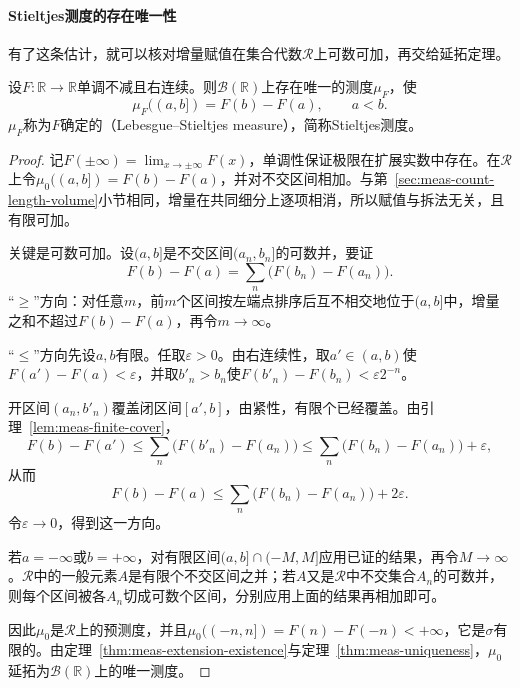 \paragraph{Stieltjes测度的存在唯一性}
有了这条估计，就可以核对增量赋值在集合代数$\mathcal R$上可数可加，再交给延拓定理。

\begin{theorem}[Stieltjes测度]
\label{thm:meas-stieltjes}
设$F:\mathbb R\to\mathbb R$单调不减且右连续。则$\mathcal B(\mathbb R)$上存在唯一的测度$\mu_F$，使
\begin{equation}
 \mu_F((a,b])=F(b)-F(a),\qquad a<b.
 \label{eq:meas-stieltjes}
\end{equation}
$\mu_F$称为$F$确定的（Lebesgue--Stieltjes measure），简称Stieltjes测度。
\end{theorem}

\begin{proof}
记$F(\pm\infty)=\lim_{x\to\pm\infty}F(x)$，单调性保证极限在扩展实数中存在。在$\mathcal R$上令$\mu_0((a,b])=F(b)-F(a)$，并对不交区间相加。与第~\ref{sec:meas-count-length-volume}小节相同，增量在共同细分上逐项相消，所以赋值与拆法无关，且有限可加。

关键是可数可加。设$(a,b]$是不交区间$(a_n,b_n]$的可数并，要证
\[
 F(b)-F(a)=\sum_n\bigl(F(b_n)-F(a_n)\bigr).
\]
“$\geq$”方向：对任意$m$，前$m$个区间按左端点排序后互不相交地位于$(a,b]$中，增量之和不超过$F(b)-F(a)$，再令$m\to\infty$。

“$\leq$”方向先设$a,b$有限。任取$\varepsilon>0$。由右连续性，取$a'\in(a,b)$使$F(a')-F(a)<\varepsilon$，并取$b'_n>b_n$使$F(b'_n)-F(b_n)<\varepsilon2^{-n}$。

开区间$(a_n,b'_n)$覆盖闭区间$[a',b]$，由紧性，有限个已经覆盖。由引理~\ref{lem:meas-finite-cover}，
\[
 F(b)-F(a')\leq\sum_n\bigl(F(b'_n)-F(a_n)\bigr)\leq\sum_n\bigl(F(b_n)-F(a_n)\bigr)+\varepsilon,
\]
从而
\[
 F(b)-F(a)\leq\sum_n\bigl(F(b_n)-F(a_n)\bigr)+2\varepsilon.
\]
令$\varepsilon\to0$，得到这一方向。

若$a=-\infty$或$b=+\infty$，对有限区间$(a,b]\cap(-M,M]$应用已证的结果，再令$M\to\infty$。$\mathcal R$中的一般元素$A$是有限个不交区间之并；若$A$又是$\mathcal R$中不交集合$A_n$的可数并，则每个区间被各$A_n$切成可数个区间，分别应用上面的结果再相加即可。

因此$\mu_0$是$\mathcal R$上的预测度，并且$\mu_0((-n,n])=F(n)-F(-n)<+\infty$，它是$\sigma$有限的。由定理~\ref{thm:meas-extension-existence}与定理~\ref{thm:meas-uniqueness}，$\mu_0$延拓为$\mathcal B(\mathbb R)$上的唯一测度。
\end{proof}

